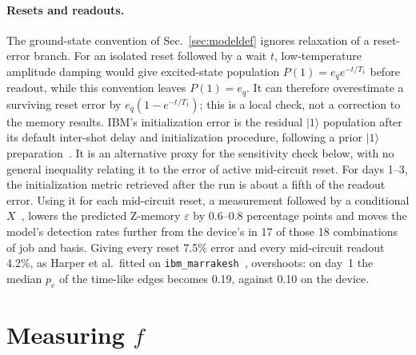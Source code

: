 \documentclass[aps,pra,reprint,nofootinbib,longbibliography,floatfix,showkeys]{revtex4-2}
\newcommand{\ket}[1]{\lvert #1\rangle}
\newcommand{\eps}{\varepsilon}
\begin{document}
\paragraph*{Resets and readouts.}
The ground-state convention of Sec.~\ref{sec:modeldef} ignores relaxation of a reset-error branch.
For an isolated reset followed by a wait $t$, low-temperature amplitude damping would give excited-state population $P(1)=e_qe^{-t/T_1}$ before readout, while this convention leaves $P(1)=e_q$.
It can therefore overestimate a surviving reset error by $e_q(1-e^{-t/T_1})$; this is a local check, not a correction to the memory results.
IBM's initialization error is the residual $\ket{1}$ population after its default inter-shot delay and initialization procedure, following a prior $\ket{1}$ preparation~\cite{ibmdocs}.
It is an alternative proxy for the sensitivity check below, with no general inequality relating it to the error of active mid-circuit reset.
For days 1--3, the initialization metric retrieved after the run is about a fifth of the readout error.
Using it for each mid-circuit reset, a measurement followed by a conditional $X$~\cite{nation2021measure,qiskitresetpass}, lowers the predicted Z-memory $\eps$ by 0.6--0.8 percentage points and moves the model's detection rates further from the device's in 17 of those 18 combinations of job and basis.
Giving every reset 7.5\% error and every mid-circuit readout 4.2\%, as Harper et al.\ fitted on \texttt{ibm\_marrakesh}~\cite{harper2026characterising}, overshoots: on day~1 the median $p_e$ of the time-like edges becomes 0.19, against 0.10 on the device.

\section{\texorpdfstring{Measuring $f$}{Measuring f}}
\label{app:f}
\end{document}

